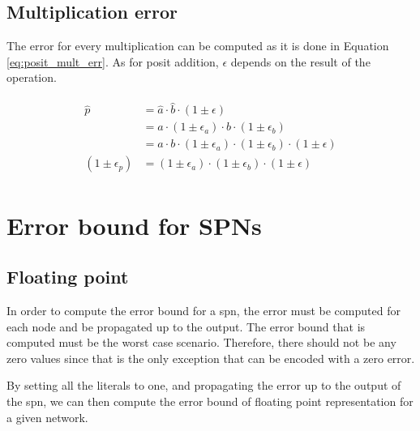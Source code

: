\subsection{Multiplication error}
The error for every multiplication can be computed as it is done in Equation \ref{eq:posit_mult_err}. As for posit addition, $\epsilon$ depends on the result of the operation.

\begin{align}
\begin{split}
\hat{p} &= \hat{a} \cdot \hat{b} \cdot (1 \pm \epsilon)\\
		&= a \cdot (1 \pm \epsilon_a) \cdot b \cdot (1 \pm \epsilon_b)\\
		&= a \cdot b \cdot (1 \pm \epsilon_a) \cdot (1 \pm \epsilon_b) \cdot (1 \pm \epsilon)\\
(1 \pm \epsilon_p) &= (1 \pm \epsilon_a) \cdot (1 \pm \epsilon_b) \cdot (1 \pm \epsilon)
\end{split}
\label{eq:posit_mult_err}
\end{align}

\section{Error bound for SPNs}

\subsection{Floating point}

In order to compute the error bound for a \gls{spn}, the error must be computed for each node and be propagated up to the output. The error bound that is computed must be the worst case scenario. Therefore, there should not be any zero values since that is the only exception that can be encoded with a zero error.

By setting all the literals to one, and propagating the error up to the output of the \gls{spn}, we can then compute the error bound of floating point representation for a given network.

